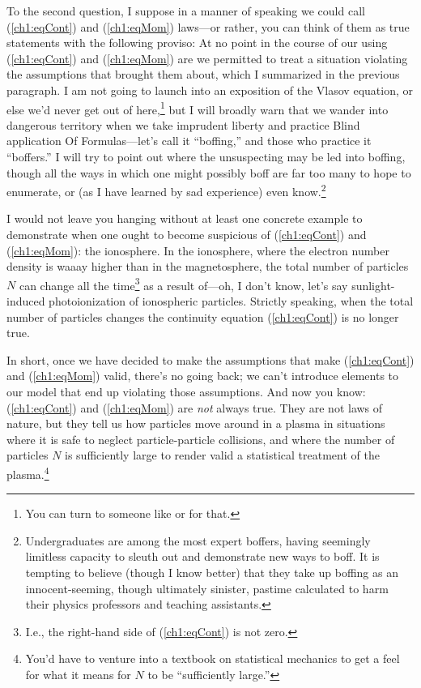 To the second question, I suppose in a manner of speaking we could call
(\ref{ch1:eqCont}) and (\ref{ch1:eqMom}) laws---or rather, you can think of them
as true statements with the following proviso: At no point in the course of our
using (\ref{ch1:eqCont}) and (\ref{ch1:eqMom}) are we permitted to treat a
situation violating the assumptions that brought them about, which I summarized
in the previous paragraph. I am not going to launch into an exposition of the
Vlasov equation, or else we'd never get out of here,\footnote{You can turn to
  someone like \citet{Chen1974} or \citet{Bellan2008} for that.} but I will
broadly warn that we wander into dangerous territory when we take imprudent
liberty and practice Blind application Of Formulas---let's call it ``boffing,''
and those who practice it ``boffers.'' I will try to point out where the
unsuspecting may be led into boffing, though all the ways in which one might
possibly boff are far too many to hope to enumerate, or (as I have learned by
sad experience) even know.\footnote{Undergraduates are among the most expert
  boffers, having seemingly limitless capacity to sleuth out and demonstrate new
  ways to boff. It is tempting to believe (though I know better) that they take
  up boffing as an innocent-seeming, though ultimately sinister, pastime
  calculated to harm their physics professors and teaching assistants.}

I would not leave you hanging without at least one concrete example to
demonstrate when one ought to become suspicious of (\ref{ch1:eqCont}) and
(\ref{ch1:eqMom}): the ionosphere. In the ionosphere, where the electron number
density is waaay higher than in the magnetosphere, the total number of particles
$N$ can change all the time\footnote{I.e., the right-hand side of
  (\ref{ch1:eqCont}) is not zero.} as a result of---oh, I don't know, let's say
sunlight-induced photoionization of ionospheric particles. Strictly speaking,
when the total number of particles changes the continuity equation
(\ref{ch1:eqCont}) is no longer true.

In short, once we have decided to make the assumptions that make
(\ref{ch1:eqCont}) and (\ref{ch1:eqMom}) valid, there's no going back; we can't
introduce elements to our model that end up violating those assumptions. And now
you know: (\ref{ch1:eqCont}) and (\ref{ch1:eqMom}) are \emph{not} always
true. They are not laws of nature, but they tell us how particles move around in
a plasma in situations where it is safe to neglect particle-particle collisions,
and where the number of particles $N$ is sufficiently large to render valid a
statistical treatment of the plasma.\footnote{You'd have to venture into a
  textbook on statistical mechanics to get a feel for what it means for $N$ to
  be ``sufficiently large.''}

